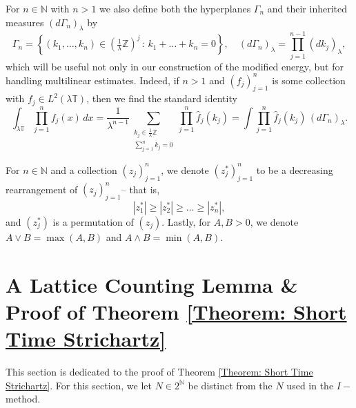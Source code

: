 \documentclass[12pt, letterpaper]{amsart}
\begin{document}
For $n\in\mathbb{N}$ with $n > 1$ we also define both the hyperplanes $\Gamma_n$ and their inherited measures $(d\Gamma_n)_\lambda$ by
\[
\Gamma_n = \left\{(k_1,\dots, k_n)\in\left(\tfrac{1}{\lambda}\mathbb{Z}\right)^j\,:\,k_1+\dots+k_n = 0\right\}, \quad (d\Gamma_n)_\lambda = \prod_{j=1}^{n-1}(dk_j)_\lambda,
\]
which will be useful not only in our construction of the modified energy, but for handling multilinear estimates. Indeed, if $n > 1$ and $(f_j)_{j=1}^n$ is some collection with $f_j\in L^2(\lambda\mathbb{T})$, then we find the standard identity
\[
\int_{\lambda\mathbb{T}}\prod_{j=1}^n f_j(x)\,dx = \frac{1}{\lambda^{n-1}}\sum_{\substack{k_j\in\tfrac{1}{\lambda}\mathbb{Z}\\ \sum_{j=1}^n k_j = 0}}\prod_{j=1}^n\widehat{f}_j(k_j) = \int \prod_{j=1}^n\widehat{f}_j(k_j)\,(d\Gamma_n)_\lambda.
\]

For $n\in\mathbb{N}$ and a collection $(z_j)_{j=1}^n$, we denote $(z_j^*)_{j=1}^n$ to be a decreasing rearrangement of $(z_j)_{j=1}^n$-- that is, 
\[
|z_1^*|\geq |z_2^*|\geq\dots\geq |z_n^*|,
\]
and $(z_j^*)$ is a permutation of $(z_j)$. Lastly, for $A,B > 0$, we denote $A\vee B = \max(A, B)$ and $A\wedge B = \min(A,B).$

\section{A Lattice Counting Lemma \& Proof of Theorem \ref{Theorem: Short Time Strichartz}}\label{Section: Proof of Theorem 2}
This section is dedicated to the proof of Theorem \ref{Theorem: Short Time Strichartz}. For this section, we let $N\in 2^\mathbb{N}$ be distinct from the $N$ used in the $I-$method. 
\end{document}
